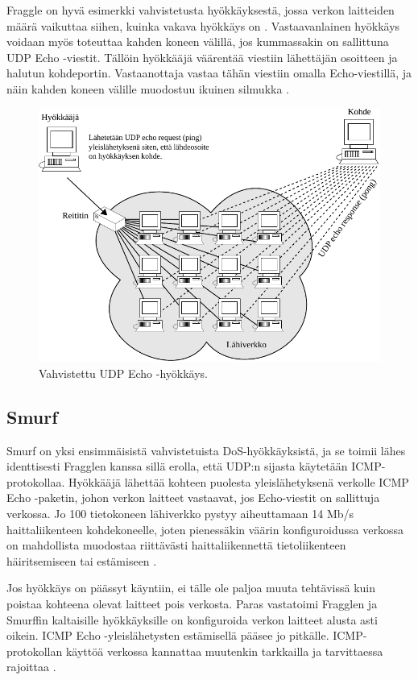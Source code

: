 Fraggle on hyvä esimerkki vahvistetusta hyökkäyksestä, jossa verkon
laitteiden määrä vaikuttaa siihen, kuinka vakava hyökkäys on
\cite{WEBS}. Vastaavanlainen hyökkäys voidaan myös toteuttaa kahden
koneen välillä, jos kummassakin on sallittuna UDP Echo
-viestit. Tällöin hyökkääjä väärentää viestiin lähettäjän osoitteen ja
halutun kohdeportin. Vastaanottaja vastaa tähän viestiin omalla
Echo-viestillä, ja näin kahden koneen välille muodostuu ikuinen
silmukka \cite{TCP}.

\begin{figure}[htp]
\centering
\includegraphics[width=13cm]{pics/fraggle.pdf}
\caption{Vahvistettu UDP Echo -hyökkäys.}
\label{fraggle}
\end{figure}

\subsection{Smurf}

Smurf on yksi ensimmäisistä vahvistetuista DoS-hyökkäyksistä, ja se
toimii lähes identtisesti Fragglen kanssa sillä erolla, että UDP:n
sijasta käytetään ICMP-\-protokollaa. Hyökkääjä lähettää kohteen
puolesta yleislähetyksenä verkolle ICMP Echo -paketin, johon verkon
laitteet vastaavat, jos Echo-viestit on sallittuja verkossa. Jo 100
tietokoneen lähiverkko pystyy aiheuttamaan 14 Mb/s haittaliikenteen
kohdekoneelle, joten pienessäkin väärin konfiguroidussa verkossa
on mahdollista muodostaa riittävästi haittaliikennettä tietoliikenteen
häiritsemiseen tai estämiseen \cite{Hacking}.

Jos hyökkäys on päässyt käyntiin, ei tälle ole paljoa muuta tehtävissä
kuin poistaa kohteena olevat laitteet pois verkosta. Paras vastatoimi
Fragglen ja Smurffin kaltaisille hyökkäyksille on konfiguroida verkon
laitteet alusta asti oikein. ICMP Echo -yleislähetysten estämisellä
pääsee jo pitkälle. ICMP-protokollan käyttöä verkossa kannattaa
muutenkin tarkkailla ja tarvittaessa rajoittaa \cite{Hacking}.

